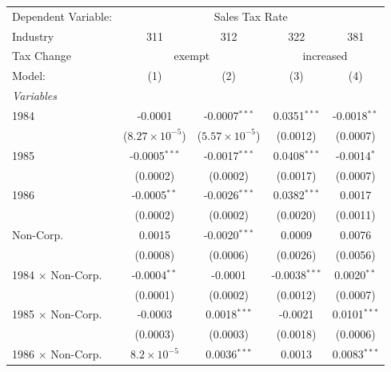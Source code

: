 \documentclass[
  12pt]{article}
\theoremstyle{definition}
\theoremstyle{remark}
\begin{document}
\begin{table}
\begin{minipage}{\linewidth}
\begingroup
\centering
\begin{tabular}{lcccc}
   \tabularnewline \midrule \midrule
   Dependent Variable: & \multicolumn{4}{c}{Sales Tax Rate}\\
   Industry                 & 311                     & 312                     & 322             & 381 \\   
   Tax Change & \multicolumn{2}{c}{exempt} & \multicolumn{2}{c}{increased} \\ 
   Model:                   & (1)                     & (2)                     & (3)             & (4)\\  
   \midrule
   \emph{Variables}\\
   1984                     & -0.0001                 & -0.0007$^{***}$         & 0.0351$^{***}$  & -0.0018$^{**}$\\   
                            & ($8.27\times 10^{-5}$)  & ($5.57\times 10^{-5}$)  & (0.0012)        & (0.0007)\\   
   1985                     & -0.0005$^{***}$         & -0.0017$^{***}$         & 0.0408$^{***}$  & -0.0014$^{*}$\\   
                            & (0.0002)                & (0.0002)                & (0.0017)        & (0.0007)\\   
   1986                     & -0.0005$^{**}$          & -0.0026$^{***}$         & 0.0382$^{***}$  & 0.0017\\   
                            & (0.0002)                & (0.0002)                & (0.0020)        & (0.0011)\\   
   Non-Corp.                & 0.0015                  & -0.0020$^{***}$         & 0.0009          & 0.0076\\   
                            & (0.0008)                & (0.0006)                & (0.0026)        & (0.0056)\\   
   1984 $\times$ Non-Corp.  & -0.0004$^{**}$          & -0.0001                 & -0.0038$^{***}$ & 0.0020$^{**}$\\   
                            & (0.0001)                & (0.0002)                & (0.0012)        & (0.0007)\\   
   1985 $\times$ Non-Corp.  & -0.0003                 & 0.0018$^{***}$          & -0.0021         & 0.0101$^{***}$\\   
                            & (0.0003)                & (0.0003)                & (0.0018)        & (0.0006)\\   
   1986 $\times$ Non-Corp.  & $8.2\times 10^{-5}$     & 0.0036$^{***}$          & 0.0013          & 0.0083$^{***}$\\   

\end{tabular}
\end{minipage}
\end{table}
\end{document}
